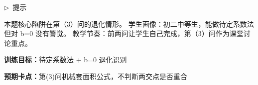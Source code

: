 \documentclass{exam-zh}
\newcommand{\edukai}{\kaishu}
\newenvironment{eduAuxItem}[1]{%
  \needspace{4\baselineskip}%
  \vspace{2mm}
  \par\noindent
  \hangindent=8mm\hangafter=1
  {\color{edu-blue}\edukai $\triangleright$~#1}\enspace
  \begingroup
  \color{edu-ink}
  \edukai
}{%
  \endgroup
  \par
  \vspace{4mm}
}
\begin{document}
\clearpage

\begin{eduAuxItem}{提示}
本题核心陷阱在第（3）问的退化情形。
学生画像：初二中等生，能做待定系数法但对 b=0 没有警觉。
教学节奏：前两问让学生自己完成，第（3）问作为课堂讨论重点。
\end{eduAuxItem}


\begin{eduTeacherNote}
  \textbf{训练目标：}待定系数法 + b=0 退化识别\par
  \textbf{预期卡点：}第(3)问机械套面积公式，不判断两交点是否重合
\end{eduTeacherNote}
\end{document}
